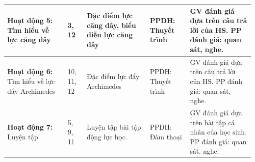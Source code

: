 \begin{center}
\begin{longtable}{|L{2.75cm}|C{1.25cm}|L{5cm}|L{3.5cm}|L{4cm}|}
		\hline
		\textbf{Hoạt động 5:} Tìm hiểu về lực căng dây& 3, 12 & Đặc điểm lực căng dây, biểu diễn lực căng dây &PPDH: Thuyết trình  & GV đánh giá dựa trên câu trả lời của HS.\newline
		PP đánh giá: quan sát, nghe.  \\
		\hline
		\textbf{Hoạt động 6:} Tìm hiểu về lực đẩy Archimedes& 10, 11, 12 & Đặc điểm lực đẩy Archimedes &PPDH: Thuyết trình  & GV đánh giá dựa trên câu trả lời của HS.\newline
		PP đánh giá: quan sát, nghe.  \\
		\hline
		\textbf{Hoạt động 7:} Luyện tập	& 5, 9, 11 & Luyện tập bài tập động lực học. & PPDH:  Đàm thoại& GV đánh giá dựa trên bài tập cá nhân của học sinh.\newline
		PP đánh giá: quan sát, nghe. \\
		\hline
	\end{longtable}
\end{center}
